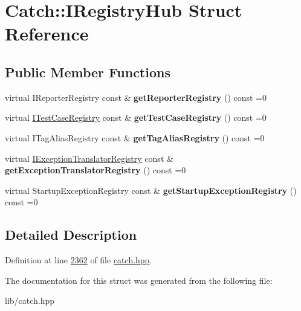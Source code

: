 \hypertarget{structCatch_1_1IRegistryHub}{}\section{Catch\+::I\+Registry\+Hub Struct Reference}
\label{structCatch_1_1IRegistryHub}
\subsection*{Public Member Functions}
\begin{DoxyCompactItemize}
\item 
\mbox{\label{structCatch_1_1IRegistryHub_a55534563f7ecf7e20ec1e37285ebe54d}} 
virtual I\+Reporter\+Registry const  \& {\bfseries get\+Reporter\+Registry} () const =0
\item 
\mbox{\label{structCatch_1_1IRegistryHub_af4f6255f0c0f8f1f179fa9d7d4843076}} 
virtual \mbox{\hyperlink{structCatch_1_1ITestCaseRegistry}{I\+Test\+Case\+Registry}} const  \& {\bfseries get\+Test\+Case\+Registry} () const =0
\item 
\mbox{\label{structCatch_1_1IRegistryHub_a3c511b1d33e5a6d95c333a0ff387df1a}} 
virtual I\+Tag\+Alias\+Registry const  \& {\bfseries get\+Tag\+Alias\+Registry} () const =0
\item 
\mbox{\label{structCatch_1_1IRegistryHub_a48347c170d9c583af73027a27b2f0bd4}} 
virtual \mbox{\hyperlink{structCatch_1_1IExceptionTranslatorRegistry}{I\+Exception\+Translator\+Registry}} const  \& {\bfseries get\+Exception\+Translator\+Registry} () const =0
\item 
\mbox{\label{structCatch_1_1IRegistryHub_a00281210628e6c616aca1d3e0d84db04}} 
virtual Startup\+Exception\+Registry const  \& {\bfseries get\+Startup\+Exception\+Registry} () const =0
\end{DoxyCompactItemize}


\subsection{Detailed Description}


Definition at line \mbox{\hyperlink{catch_8hpp_source_l02362}{2362}} of file \mbox{\hyperlink{catch_8hpp_source}{catch.\+hpp}}.



The documentation for this struct was generated from the following file\+:\begin{DoxyCompactItemize}
\item 
lib/catch.\+hpp\end{DoxyCompactItemize}

